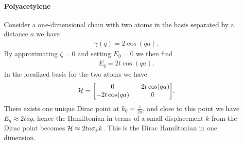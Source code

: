 \paragraph{Polyacetylene}
Consider a one-dimensional chain with two atoms in the basis separated by a distance $a$ we have
\begin{align*}
	\gamma(q) = 2\cos(qa).
\end{align*}
By approximating $\zeta = 0$ and setting $E_{0} = 0$ we then find
\begin{align*}
	E_{q} = 2t\cos(qa).
\end{align*}
In the localized basis for the two atoms we have
\begin{align*}
	\ham = \mqty[
		0          & -2t\cos(qa) \\
		-2t\cos(qa) & 0
	].
\end{align*}
There exists one unique Dirac point at $k_{0} = \frac{\pi}{2a}$, and close to this point we have $E_{q} \approx 2taq$, hence the Hamiltonian in terms of a small displacement $k$ from the Dirac point becomes $\mathcal{H} \approx 2ta\sigma_{x}k$. This is the Dirac Hamiltonian in one dimension.

